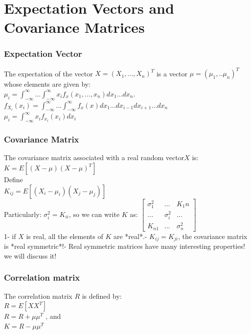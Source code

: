 \documentclass{beamer}
\begin{document}
 \section {Expectation Vectors and Covariance Matrices}
\begin{frame}
\frametitle{Expectation Vector}
The expectation of the vector $X=(X_1,...,X_n)^T$ is a vector $\mu = (\mu_1,..\mu_n)^T$ whose elements are given by:\newline\\
$\mu_i = \int_{-\infty}^{\infty}...\int_{-\infty}^{\infty} x_if_x(x_1,...,x_n)dx_1...dx_n.$\newline\\
$f_{X_i}(x_i) = \int_{-\infty}^{\infty}...\int_{-\infty}^{\infty} f_x(x)dx_1...dx_{i-1}dx_{i+1}...dx_n$\newline\\
$\mu_i=\int_{-\infty}^\infty x_if_{x_i}(x_i)dx_i$
\end{frame}

\begin{frame}
\frametitle{Covariance Matrix}
The covariance matrix associated with a real random vector$X$ is:\newline\\
$K = E[(X-\mu)(X-\mu)^T]$\newline\\
Define\newline\\
$K_{ij}= E[(X_i-\mu_i)(X_j-\mu_j)]$\newline\\
Particularly:
$\sigma_i^2=K_{ii}$, so we can write $K$ as:
$\begin{bmatrix}
   \sigma_1^2& ...&K_1n \\
    ...&\sigma_i^2&...\\
    K_{n1}&...&\sigma_n^2
\end{bmatrix}$\newline\\
1- if $X$ is real, all the elements of $K$ are *real*.- $K_{ij}=K_{ji}$, the covariance matrix is *real symmetric*!- Real symmetric matrices have many interesting properties! we will discuss it!\newline
\end{frame}

\begin{frame}
\frametitle{Correlation matrix}
The correlation matrix $R$ is defined by:\newline\\
$R=E[XX^T]$\newline\\
$R=R+\mu \mu^T$
, and\newline\\
$K=R-\mu\mu^T$\newline\\
\end{frame}
\end{document}
